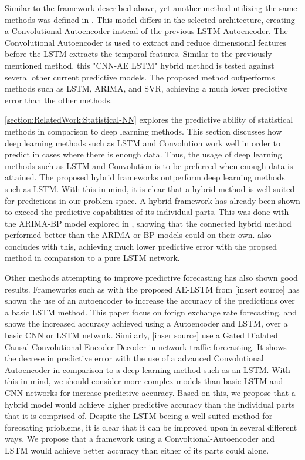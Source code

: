 Similar to the framework described above, yet another method utilizing the same methods was defined in \cite{Zaho2019}.
This model differs in the selected architecture, creating a Convolutional Autoencoder instead of the previous LSTM Autoencoder.
The Convolutional Autoencoder is used to extract and reduce dimensional features before the LSTM extracts the temporal features.
Similar to the previously mentioned method, this "CNN-AE LSTM" hybrid method is tested against several other current predictive models.
The proposed method outperforms methods such as LSTM, ARIMA, and SVR, achieving a much lower predictive error than the other methods.


\ref{section:RelatedWork:Statistical-NN} explores the predictive ability of statistical methods in comparison to deep learning methods.
This section discusses how deep learning methods such as LSTM and Convolution work well in order to predict in cases where there is enough data.
Thus, the usage of deep learning methods such as LSTM and Convolution is to be preferred when enough data is attained.
The proposed hybrid frameworks outperform deep learning methods such as LSTM.
With this in mind, it is clear that a hybrid method is well suited for predictions in our problem space.
A hybrid framework has already been shown to exceed the predictive capabilities of its individual parts.
This was done with the ARIMA-BP model explored in \cite{Bowen2020}, showing that the connected hybrid method performed better than the ARIMA or BP models could on their own.
\cite{Zhao2019} also concludes with this, achieving much lower predictive error with the propsed method in comparsion to a pure LSTM network.

Other methods attempting to improve predictive forecasting has also shown good results.
Frameworks such as with the proposed AE-LSTM from [insert source] has shown the use of an autoencoder to increase the accuracy of the predictions over a basic LSTM method.
This paper focus on forign exchange rate forecasting, and shows the increased accuracy achieved using a Autoencoder and LSTM, over a basic CNN or LSTM network.
Similarly, [inser source] use a Gated Dialated Causal Convolutional Encoder-Decoder in network traffic forecasting.
It shows the decrese in predictive error with the use of a advanced Convolutional Autoencoder in comparison to a deep learning method such as an LSTM.
With this in mind, we should consider more complex models than basic LSTM and CNN networks for increase predictive accuracy.
Based on this, we propose that a hybrid model would achieve higher predictive accuracy than the individual parts that it is comprised of.
Despite the LSTM beeing a well suited method for forecsating prioblems, it is clear that it can be improved upon in several different ways.
We propose that a framework using a Convoltional-Autoencoder and LSTM would achieve better accuracy than either of its parts could alone.


